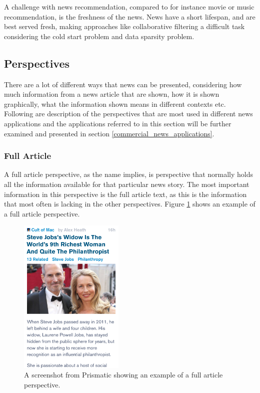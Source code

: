 A challenge with news recommendation, compared to for instance movie or music recommendation, is the freshness of the news. News have a short lifespan, and are best served fresh, making approaches like collaborative filtering a difficult task considering the cold start problem and data sparsity problem.

\subsection{Perspectives}
\label{theoretical_bg_perspectives}
There are a lot of different ways that news can be presented, considering how much information from a news article that are shown, how it is shown graphically, what the information shown means in different contexts etc. Following are description of the perspectives that are most used in different news applications and the applications referred to in this section will be further examined and presented in section \ref{commercial_news_applications}.

\subsubsection{Full Article}
A full article perspective, as the name implies, is perspective that normally holds all the information available for that particular news story. The most important information in this perspective is the full article text, as this is the information that most often is lacking in the other perspectives. Figure \ref{full_article_prismatic} shows an example of a full article perspective.

\begin{figure}[!htbp]
\centering
\includegraphics[width=50mm]{GFX/perspectives/fullArticleViewPrismatic.png}
\caption{A screenshot from Prismatic showing an example of a full article perspective.}
\label{full_article_prismatic}
\end{figure}

